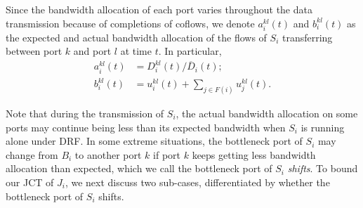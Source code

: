 \documentclass[10pt, conference, letterpaper]{IEEEtran}
\begin{document}
\begin{IEEEproof}
Since the bandwidth allocation of each port varies throughout the data transmission because of completions of coflows, we denote $a_i^{kl}(t)$ and $b_i^{kl}(t)$ as the expected and actual bandwidth allocation of the flows  of $S_i$ transferring between port $k$ and port $l$ at time $t$. In particular,
\begin{align}
	\label{actual} a_i^{kl}(t) &= D_i^{kl}(t)/\overline{D}_i(t);\\
	b_i^{kl}(t) &= u_i^{kl}(t) + \sum_{j\in F(i)}u_j^{kl}(t).
\end{align}

Note that during the transmission of $S_i$, the actual bandwidth allocation on some ports may continue being less than its expected bandwidth when $S_i$  is running alone under DRF. In some extreme situations, the bottleneck port of $S_i$ may change from $B_i$ to another port $k$ if port $k$ keeps getting less bandwidth allocation than expected, which we call the bottleneck port of $S_i$ \emph{shifts}. To bound our JCT of $J_i$, we next discuss two sub-cases, differentiated by whether the bottleneck port of $S_i$ shifts.


\end{IEEEproof}
\end{document}
